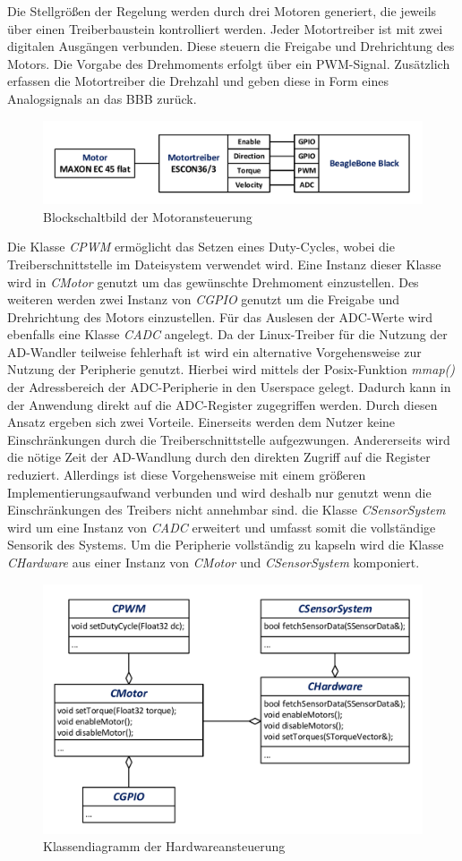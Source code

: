 Die Stellgrößen der Regelung werden durch drei Motoren generiert, die jeweils über einen Treiberbaustein kontrolliert werden. Jeder Motortreiber ist mit zwei digitalen Ausgängen verbunden. Diese steuern die Freigabe und Drehrichtung des Motors. Die Vorgabe des Drehmoments erfolgt über ein \ac{PWM}-Signal. Zusätzlich erfassen die Motortreiber die Drehzahl und geben diese in Form eines Analogsignals an das \ac{BBB} zurück.
\begin{figure}[!h]
\centering
\includegraphics[width=0.7\linewidth]{img/SW_0_Motoren_BSB.pdf}
\caption{Blockschaltbild der Motoransteuerung} 
\end{figure}
Die Klasse \textit{CPWM} ermöglicht das Setzen eines Duty-Cycles, wobei die Treiberschnittstelle im Dateisystem verwendet wird. Eine Instanz dieser Klasse wird in \textit{CMotor} genutzt um das gewünschte Drehmoment einzustellen. Des weiteren werden zwei Instanz von \textit{CGPIO} genutzt um die Freigabe und Drehrichtung des Motors einzustellen. Für das Auslesen der \ac{ADC}-Werte wird ebenfalls eine Klasse \textit{C\ac{ADC}} angelegt. Da der Linux-Treiber für die Nutzung der AD-Wandler teilweise fehlerhaft ist wird ein alternative Vorgehensweise zur Nutzung der Peripherie genutzt. Hierbei wird mittels der Posix-Funktion \textit{mmap()} der Adressbereich der \ac{ADC}-Peripherie in den Userspace gelegt. Dadurch kann in der Anwendung direkt auf die \ac{ADC}-Register zugegriffen werden. Durch diesen Ansatz ergeben sich zwei Vorteile. Einerseits werden dem Nutzer keine Einschränkungen durch die Treiberschnittstelle aufgezwungen. Andererseits wird die nötige Zeit der AD-Wandlung durch den direkten Zugriff auf die Register reduziert. Allerdings ist diese Vorgehensweise mit einem größeren Implementierungsaufwand verbunden und wird deshalb nur genutzt wenn die Einschränkungen des Treibers nicht annehmbar sind.
die Klasse \textit{CSensorSystem} wird um eine Instanz von \textit{CADC} erweitert und umfasst somit die vollständige Sensorik des Systems. Um die Peripherie vollständig zu kapseln wird die Klasse \textit{CHardware} aus einer Instanz von \textit{CMotor} und \textit{CSensorSystem} komponiert.
\begin{figure}[!h]
\centering
\includegraphics[width=0.7\linewidth]{img/SW_0_Hardware_KD.pdf}
\caption{Klassendiagramm der Hardwareansteuerung}
\end{figure}